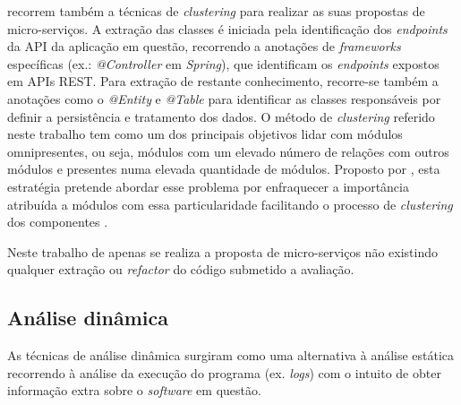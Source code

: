     \cite{kamimura18_city_analogy} recorrem também a técnicas de \textit{clustering} para realizar as suas propostas de micro-serviços. A extração das classes é iniciada pela identificação dos \textit{endpoints} da API da aplicação em questão, recorrendo a anotações de \textit{frameworks} específicas (ex.: \textit{@Controller} em \textit{Spring}), que identificam os \textit{endpoints} expostos em APIs REST. Para extração de restante conhecimento, recorre-se também a anotações como o \textit{@Entity} e \textit{@Table} para identificar as classes responsáveis por definir a persistência e tratamento dos dados. O método de \textit{clustering} referido neste trabalho tem como um dos principais objetivos lidar com módulos omnipresentes, ou seja, módulos com um elevado número de relações com outros módulos e presentes numa elevada quantidade de módulos. Proposto por \cite{kobayashi12_feature_gathering_software_clustering}, esta estratégia pretende abordar esse problema por enfraquecer a importância atribuída a módulos com essa particularidade facilitando o processo de \textit{clustering} dos componentes \citep{kobayasi13_sarf}. 
    
    
    Neste trabalho de \cite{kamimura18_city_analogy} apenas se realiza a proposta de micro-serviços não existindo qualquer extração ou \textit{refactor} do código submetido a avaliação.
    
    
    
    


\subsection{Análise dinâmica}
    
    As técnicas de análise dinâmica surgiram como uma alternativa à análise estática recorrendo à análise da execução do programa (ex. \textit{logs}) com o intuito de obter informação extra sobre o \textit{software} em questão. 
    
